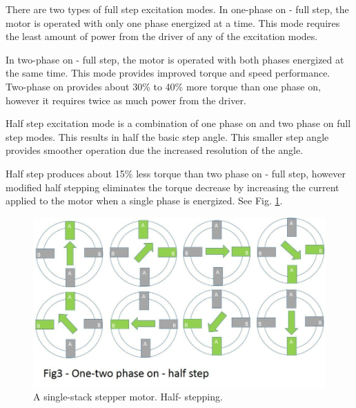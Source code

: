 \documentclass[journal]{IEEEtran}
\begin{document}
There are two types of full step excitation modes.
In one-phase on - full step, the motor is operated with only one phase energized at a time. This mode requires the least amount of power from the driver of any of the excitation modes.

In two-phase on - full step, the motor is operated with both phases energized at the same time. This mode provides improved torque and speed performance. Two-phase on provides about 30\% to 40\% more torque than one phase on, however it requires twice as much power from the driver.

Half step excitation mode is a combination of one phase on and two phase on full step modes. This results in half the basic step angle. This smaller step angle provides smoother operation due the increased resolution of the angle.

Half step produces about 15\% less torque than two phase on - full step, however modified half stepping eliminates the torque decrease by increasing the current applied to the motor when a single phase is energized. See Fig. \ref{half stepping}. \cite{website_microstep}


\begin{figure}[h]
    \centering
    \includegraphics[trim={0 2cm 0 0},clip,scale=0.34]{Stepper/halfstep.jpg}
    \caption{A single-stack stepper motor. Half- stepping.}
    \label{half stepping}
\end{figure}



\end{document}
